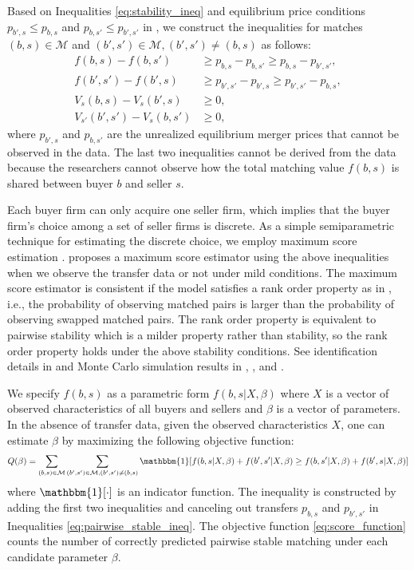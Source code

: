 \documentclass[10pt]{article}
\begin{document}
Based on Inequalities \eqref{eq:stability_ineq} and equilibrium price conditions $p_{b',s}\le p_{b,s}$ and $p_{b,s'}\le p_{b',s'}$ in \cite{akkus2015ms}, we construct the inequalities for matches $(b,s)\in \mathcal{M}$ and $(b',s')\in \mathcal{M}, (b',s')\neq(b,s)$ as follows:
\begin{align}
    f(b,s)-f(b,s')&\ge p_{b,s}-p_{b,s'}\ge p_{b,s}-p_{b',s'},\label{eq:pairwise_stable_ineq}\\
    f(b',s')-f(b',s)&\ge p_{b',s'}-p_{b',s}\ge p_{b',s'}-p_{b,s},\nonumber\\
    V_s(b,s)-V_s(b',s)&\ge 0,\nonumber\\
    V_{s'}(b',s')-V_s(b,s')&\ge 0,\nonumber
\end{align}
where $p_{b',s}$ and $p_{b,s'}$ are the unrealized equilibrium merger prices that cannot be observed in the data. The last two inequalities cannot be derived from the data because the researchers cannot observe how the total matching value $f(b,s)$ is shared between buyer $b$ and seller $s$.

Each buyer firm can only acquire one seller firm, which implies that the buyer firm’s choice among a set of seller firms is discrete. 
As a simple semiparametric technique for estimating the discrete choice, we employ maximum score estimation \cite{manski1975maximum,manski1985semiparametric}.
\cite{fox2018qe} proposes a maximum score
estimator using the above inequalities when we observe the transfer data or not under mild conditions. 
The maximum score estimator is consistent if the model satisfies a rank order property as in \cite{manski1975maximum,manski1985semiparametric}, i.e., the probability of observing matched pairs is larger than the probability of observing swapped matched pairs. 
The rank order property is equivalent to pairwise stability which is a milder property rather than stability, so the rank order property holds under the above stability conditions. See identification details in \cite{fox2010qe} and Monte Carlo simulation results in \cite{fox2018qe}, \cite{akkus2015ms}, and \cite{otani2021matching_cost}.

We specify $f(b,s)$ as a parametric form $f(b,s|X,\beta)$ where $X$ is a vector of observed characteristics of all buyers and sellers and $\beta$ is a vector of parameters. 
In the absence of transfer data, given the observed characteristics $X$, one can estimate $\beta$ by maximizing the following objective function:
\begin{align}
    Q(\beta)=\sum_{(b,s)\in \mathcal{M}} \sum_{(b',s')\in \mathcal{M},(b',s')\neq (b,s)} \mathbbm{1}[f(b,s|X,\beta)+ f(b',s'|X,\beta)\ge f(b,s'|X,\beta)+f(b',s|X,\beta)]\label{eq:score_function}
\end{align}
where $\mathbbm{1}[\cdot]$ is an indicator function. 
The inequality is constructed by adding the first two inequalities and canceling out transfers $p_{b,s}$ and $p_{b',s'}$ in Inequalities \eqref{eq:pairwise_stable_ineq}.
The objective function \eqref{eq:score_function} counts the number of correctly predicted pairwise stable matching under each candidate parameter $\beta$.
\end{document}
